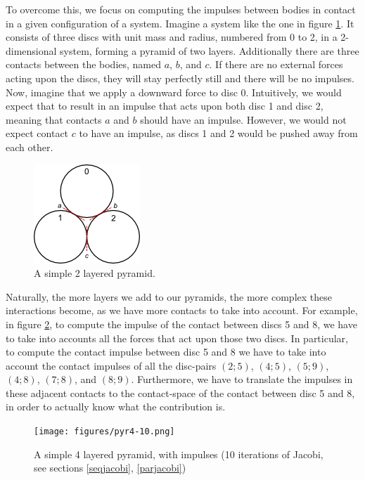 \documentclass[runningheads,a4paper]{llncs}
\begin{document}

To overcome this, we focus on computing the impulses between bodies in contact
in a given configuration of a system. Imagine a system like the one in figure
\ref{fig:pyr2simple}. It consists of three discs with unit mass and radius,
numbered from 0 to 2, in a 2-dimensional system, forming a pyramid of two
layers. Additionally there are three contacts between the bodies, named $a$,
$b$, and $c$. If there are no external forces acting upon the discs, they will
stay perfectly still and there will be no impulses. Now, imagine that we apply
a downward force to disc 0. Intuitively, we would expect that to result in an
impulse that acts upon both disc 1 and disc 2, meaning that contacts $a$ and
$b$ should have an impulse. However, we would not expect contact $c$ to have an
impulse, as discs 1 and 2 would be pushed away from each other.

\begin{figure}
  \centering
  \includegraphics{figures/pyr2simple.png}
  \caption{A simple 2 layered pyramid.}
  \label{fig:pyr2simple}
\end{figure}

Naturally, the more layers we add to our pyramids, the more complex these
interactions become, as we have more contacts to take into account. For example,
in figure \ref{fig:pyr4-10}, to compute the impulse of the contact between discs
5 and 8, we have to take into accounts all the forces that act upon those two
discs. In particular, to compute the contact impulse between disc 5 and 8 we
have to take into account the contact impulses of all the disc-pairs $(2;5)$,
$(4;5)$, $(5;9)$, $(4;8)$, $(7;8)$, and $(8;9)$. Furthermore, we have to
translate the impulses in these adjacent contacts to the contact-space of the
contact between disc 5 and 8, in order to actually know what the contribution
is.

\begin{figure}
  \centering
  \texttt{[image: figures/pyr4-10.png]}
  \caption{A simple 4 layered pyramid, with impulses (10 iterations of Jacobi, see sections \ref{seqjacobi}, \ref{parjacobi})}
  \label{fig:pyr4-10}
\end{figure}
\end{document}
